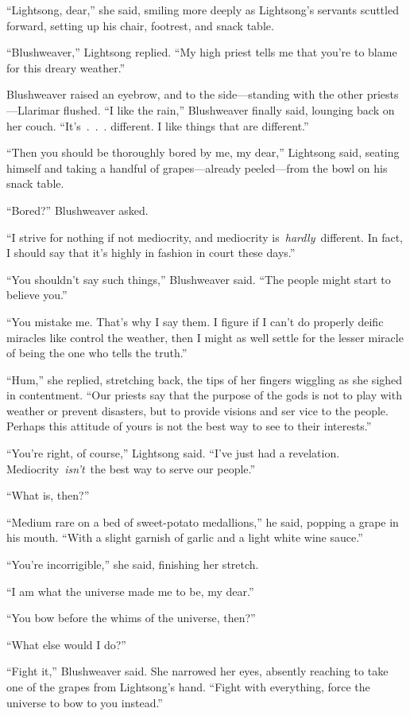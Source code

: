 “Lightsong, dear,” she said, smiling more deeply as Lightsong’s servants scuttled forward, setting up his chair, footrest, and snack table.

“Blushweaver,” Lightsong replied. “My high priest tells me that you’re to blame for this dreary weather.”

Blushweaver raised an eyebrow, and to the side—standing with the other priests—Llarimar flushed. “I like the rain,” Blushweaver finally said, lounging back on her couch. “It’s~.~.~. different. I like things that are different.”

“Then you should be thoroughly bored by me, my dear,” Lightsong said, seating himself and taking a handful of grapes—already peeled—from the bowl on his snack table.

“Bored?” Blushweaver asked.

“I strive for nothing if not mediocrity, and mediocrity is~\textit{hardly}~different. In fact, I should say that it’s highly in fashion in court these days.”

“You shouldn’t say such things,” Blushweaver said. “The people might start to believe you.”

“You mistake me. That’s why I say them. I figure if I can’t do properly deific miracles like control the weather, then I might as well settle for the lesser miracle of being the one who tells the truth.”

“Hum,” she replied, stretching back, the tips of her fingers wiggling as she sighed in contentment. “Our priests say that the purpose of the gods is not to play with weather or prevent disasters, but to provide visions and ser vice to the people. Perhaps this attitude of yours is not the best way to see to their interests.”

“You’re right, of course,” Lightsong said. “I’ve just had a revelation. Mediocrity~\textit{isn’t}~the best way to serve our people.”

“What is, then?”

“Medium rare on a bed of sweet-potato medallions,” he said, popping a grape in his mouth. “With a slight garnish of garlic and a light white wine sauce.”

“You’re incorrigible,” she said, finishing her stretch.

“I am what the universe made me to be, my dear.”

“You bow before the whims of the universe, then?”

“What else would I do?”

“Fight it,” Blushweaver said. She narrowed her eyes, absently reaching to take one of the grapes from Lightsong’s hand. “Fight with everything, force the universe to bow to you instead.”

